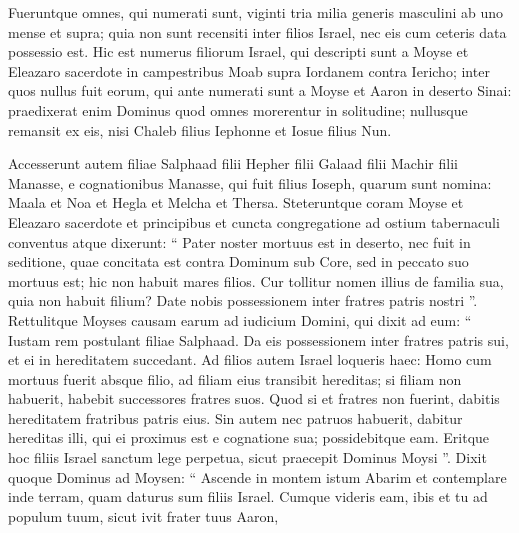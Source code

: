 \begin{biblechapter}
\begin{biblechapter}
\begin{biblechapter}
\begin{biblechapter}
\begin{biblechapter}
\begin{biblechapter}
\begin{biblechapter}
\begin{biblechapter}
\begin{biblechapter}
\begin{biblechapter}
\begin{biblechapter}
\begin{biblechapter}
\begin{biblechapter}
\begin{biblechapter}
\begin{biblechapter}
\begin{biblechapter}
\begin{biblechapter}
\begin{biblechapter}
\begin{biblechapter}
\begin{biblechapter}
\begin{biblechapter}
\begin{biblechapter}
\begin{biblechapter}
\begin{biblechapter}
\begin{biblechapter}
\begin{biblechapter}
 \verse Fueruntque omnes, qui numerati sunt, viginti tria milia generis masculini ab uno mense et supra; quia non sunt recensiti inter filios Israel, nec eis cum ceteris data possessio est.
 \verse Hic est numerus filiorum Israel, qui descripti sunt a Moyse et Eleazaro sacerdote in campestribus Moab supra Iordanem contra Iericho; 
\verse inter quos nullus fuit eorum, qui ante numerati sunt a Moyse et Aaron in deserto Sinai: 
 \verse praedixerat enim Dominus quod omnes morerentur in solitudine; nullusque remansit ex eis, nisi Chaleb filius Iephonne et Iosue filius Nun.
 
\begin{biblechapter}
\verse Accesserunt autem filiae Salphaad filii Hepher filii Galaad filii Machir filii Manasse, e cognationibus Manasse, qui fuit filius Ioseph, quarum sunt nomina: Maala et Noa et Hegla et Melcha et Thersa. 
\verse Steteruntque coram Moyse et Eleazaro sacerdote et principibus et cuncta congregatione ad ostium tabernaculi conventus atque dixerunt: 
\verse “ Pater noster mortuus est in deserto, nec fuit in seditione, quae concitata est contra Dominum sub Core, sed in peccato suo mortuus est; hic non habuit mares filios. 
\verse Cur tollitur nomen illius de familia sua, quia non habuit filium? Date nobis possessionem inter fratres patris nostri ”.
 \verse Rettulitque Moyses causam earum ad iudicium Domini, 
\verse qui dixit ad eum: 
 \verse “ Iustam rem postulant filiae Salphaad. Da eis possessionem inter fratres patris sui, et ei in hereditatem succedant. 
\verse Ad filios autem Israel loqueris haec: Homo cum mortuus fuerit absque filio, ad filiam eius transibit hereditas; 
\verse si filiam non habuerit, habebit successores fratres suos. 
 \verse Quod si et fratres non fuerint, dabitis hereditatem fratribus patris eius. 
 \verse Sin autem nec patruos habuerit, dabitur hereditas illi, qui ei proximus est e cognatione sua; possidebitque eam. Eritque hoc filiis Israel sanctum lege perpetua, sicut praecepit Dominus Moysi ”.
 \verse Dixit quoque Dominus ad Moysen: “ Ascende in montem istum Abarim et contemplare inde terram, quam daturus sum filiis Israel. 
\verse Cumque videris eam, ibis et tu ad populum tuum, sicut ivit frater tuus Aaron, 

\end{biblechapter}
\end{biblechapter}
\end{biblechapter}
\end{biblechapter}
\end{biblechapter}
\end{biblechapter}
\end{biblechapter}
\end{biblechapter}
\end{biblechapter}
\end{biblechapter}
\end{biblechapter}
\end{biblechapter}
\end{biblechapter}
\end{biblechapter}
\end{biblechapter}
\end{biblechapter}
\end{biblechapter}
\end{biblechapter}
\end{biblechapter}
\end{biblechapter}
\end{biblechapter}
\end{biblechapter}
\end{biblechapter}
\end{biblechapter}
\end{biblechapter}
\end{biblechapter}
\end{biblechapter}
